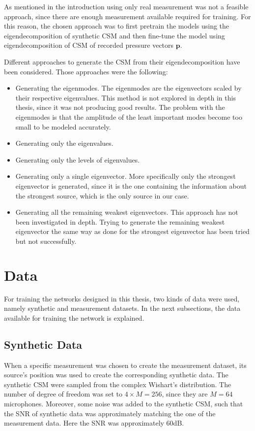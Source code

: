 \documentclass[11pt,a4paper,twoside]{report}
\begin{document}
As mentioned in the introduction using only real measurement was not a feasible approach, since there are enough measurement available required for training. For this reason, the chosen approach was to first pretrain the models using the eigendecomposition of synthetic CSM and then fine-tune the model using eigendecomposition of CSM of recorded pressure vectors $\mathbf{p}$. 

Different approaches to generate the CSM from their eigendecomposition have been considered. Those approaches were the following:

\begin{itemize}
    \item Generating the eigenmodes. The eigenmodes are the eigenvectors scaled by their respective eigenvalues. This method is not explored in depth in this thesis, since it was not producing good results. The problem with the eigenmodes is that the amplitude of the least important modes become too small to be modeled accurately. 
    \item Generating only the eigenvalues.
    \item Generating only the levels of eigenvalues.
    \item Generating only a single eigenvector. More specifically only the strongest eigenvector is generated, since it is the one containing the information about the strongest source, which is the only source in our case. 
    \item Generating all the remaining weakest eigenvectors. This approach has not been investigated in depth. Trying to generate the remaining weakest eigenvector the same way as done for the strongest eigenvector has been tried but not successfully.  
\end{itemize}

\section{Data}

For training the networks designed in this thesis, two kinds of data were used, namely synthetic and measurement datasets. In the next subsections, the data available for training the network is explained. 

\subsection{Synthetic Data}

When a specific measurement was chosen to create the measurement dataset, its source's position was used to create the corresponding synthetic data. The synthetic CSM were sampled from the complex Wishart's distribution. The number of degree of freedom was set to $4 \times M = 256$, since they are $M = 64$ microphones. Moreover, some noise was added to the synthetic CSM, such that the SNR of synthetic data was approximately matching the one of the measurement data. Here the SNR was approximately 60dB. 
\end{document}
